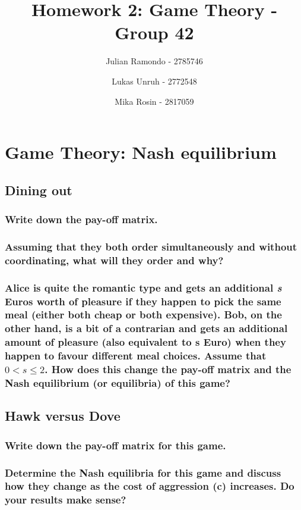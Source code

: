 \documentclass[11pt]{article}
\title{Homework 2: Game Theory - Group 42}
\author{Julian Ramondo - 2785746 \and Lukas Unruh - 2772548 \and Mika Rosin - 2817059}
\begin{document}
    \maketitle

    \setcounter{section}{1}
    \section{Game Theory: Nash equilibrium}

    \subsection{Dining out}
    \subsubsection{Write down the pay-off matrix.}
    \subsubsection{Assuming that they both order simultaneously and without coordinating, what will they order and why?}
    \subsubsection{Alice is quite the romantic type and gets an additional \textit{s} Euros worth of pleasure if they happen to pick the same meal (either both cheap or both expensive). Bob, on the other hand, is a bit of a contrarian and gets an additional amount of pleasure (also equivalent to \textbf{s} Euro) when they happen to favour different meal choices. Assume that $ 0 < s \leq 2 $. How does this change the pay-off matrix and the Nash equilibrium (or equilibria) of this game?}



    \subsection{Hawk versus Dove}

    \subsubsection{Write down the pay-off matrix for this game.}

    \subsubsection{Determine the Nash equilibria for this game and discuss how they change as the cost of aggression (c) increases. Do your results make sense?}
\end{document}
